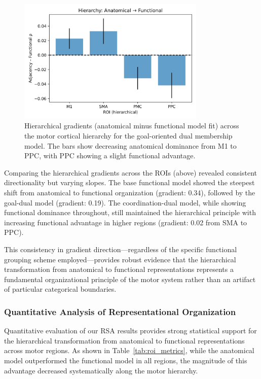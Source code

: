 \documentclass{article}
\begin{document}
\begin{figure}[!htbp]
\centering
\includegraphics[width=0.8\textwidth]{results/goal_dual/hierarchy_adjacency_vs_functional.png}
\caption{Hierarchical gradients (anatomical minus functional model fit) across the motor cortical hierarchy for the goal-oriented dual membership model. The bars show decreasing anatomical dominance from M1 to PPC, with PPC showing a slight functional advantage.}
\label{fig:hierarchy_gradients}
\end{figure}

Comparing the hierarchical gradients across the ROIs (above) revealed consistent directionality but varying slopes. The base functional model showed the steepest shift from anatomical to functional organization (gradient: 0.34), followed by the goal-dual model (gradient: 0.19). The coordination-dual model, while showing functional dominance throughout, still maintained the hierarchical principle with increasing functional advantage in higher regions (gradient: 0.02 from SMA to PPC).

This consistency in gradient direction—regardless of the specific functional grouping scheme employed—provides robust evidence that the hierarchical transformation from anatomical to functional representations represents a fundamental organizational principle of the motor system rather than an artifact of particular categorical boundaries.

\subsubsection{Quantitative Analysis of Representational Organization}

Quantitative evaluation of our RSA results provides strong statistical support for the hierarchical transformation from anatomical to functional representations across motor regions. As shown in Table~\ref{tab:roi_metrics}, while the anatomical model outperformed the functional model in all regions, the magnitude of this advantage decreased systematically along the motor hierarchy.
\end{document}
